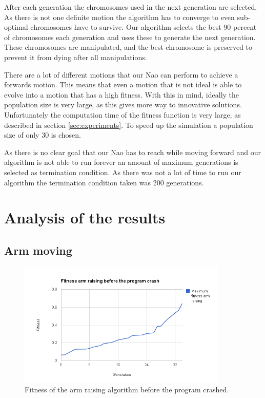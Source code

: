 \documentclass[a4paper,10pt]{article}
\begin{document}
After each generation the chromosomes used in the next generation are selected. As there is not one definite motion the algorithm has to converge to even sub-optimal chromosomes have to survive. Our algorithm selects the best 90 percent of chromosomes each generation and uses these to generate the next generation. These chromosomes are manipulated, and the best chromosome is preserved to prevent it from dying after all manipulations. 

There are a lot of different motions that our Nao can perform to achieve a forwards motion. This means that even a motion that is not ideal is able to evolve into a motion that has a high fitness. With this in mind, ideally the population size is very large, as this gives more way to innovative solutions. Unfortunately the computation time of the fitness function is very large, as described in section \ref{sec:experiments}. To speed up the simulation a population size of only 30 is chosen. 

As there is no clear goal that our Nao has to reach while moving forward and our algorithm is not able to run forever an amount of maximum generations is selected as termination condition. As there was not a lot of time to run our algorithm the termination condition taken was 200 generations. 


\section{Analysis of the results}
\label{sec:analysisOfTheResults}
\subsection{Arm moving}
\label{sec:resultsJGapArmMoving}

\begin{figure}[h!]
\includegraphics[width=100mm]{images/arm}
\caption{Fitness of the arm raising algorithm before the program crashed.}
\label{fig:armFitness}
\end{figure}
\end{document}
